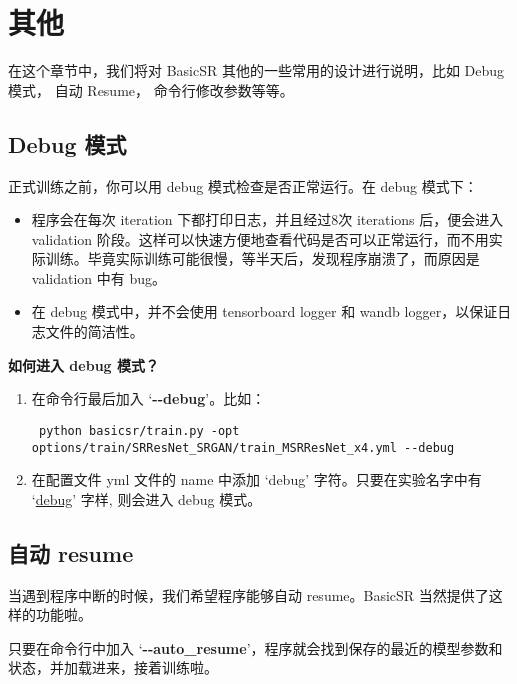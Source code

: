 \documentclass[../main.tex]{subfiles}
\begin{document}
\chapter{其他}
\vspace{-2cm}

在这个章节中，我们将对 BasicSR 其他的一些常用的设计进行说明，比如 Debug 模式， 自动 Resume， 命令行修改参数等等。

\section{Debug 模式}\label{others:debug_mode}

正式训练之前，你可以用 debug 模式检查是否正常运行。在 debug 模式下：
\begin{itemize}
    \item 程序会在每次 iteration 下都打印日志，并且经过8次 iterations 后，便会进入 validation 阶段。这样可以快速方便地查看代码是否可以正常运行，而不用实际训练。毕竟实际训练可能很慢，等半天后，发现程序崩溃了，而原因是 validation 中有 bug。
    \item 在 debug 模式中，并不会使用 tensorboard logger 和 wandb logger，以保证日志文件的简洁性。
\end{itemize}

\textbf{如何进入 debug 模式？}

\begin{enumerate}[方式 1.]
    \item 在命令行最后加入 ‘\textbf{-{}-debug}’。比如：
          \begin{verbatim}
 python basicsr/train.py -opt options/train/SRResNet_SRGAN/train_MSRResNet_x4.yml --debug
    \end{verbatim}
    \item 在配置文件 yml 文件的 name 中添加 ‘debug’ 字符。只要在实验名字中有 ‘\uline{debug}’ 字样, 则会进入 debug 模式。
\end{enumerate}

\section{自动 resume}\label{others:auto_resume}

当遇到程序中断的时候，我们希望程序能够自动 resume。BasicSR 当然提供了这样的功能啦。

只要在命令行中加入 ‘\textbf{-{}-auto\_resume}’，程序就会找到保存的最近的模型参数和状态，并加载进来，接着训练啦。
\end{document}
